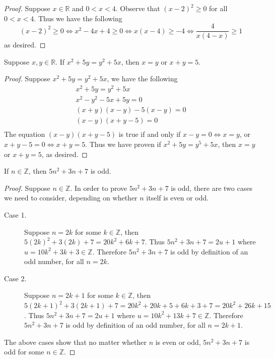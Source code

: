 \documentclass{exam}
\begin{document}
\begin{proof}
    Suppose $x\in\mathbb R$ and $0 < x < 4$. Observe that $(x-2)^2 \ge 0$ for all $0 < x < 4$. Thus we have the following \[
        (x-2)^2 \ge 0 \Leftrightarrow x^2-4x+4\ge0\Leftrightarrow x(x-4)\ge-4\Leftrightarrow \frac{4}{x(4-x)}\ge1
    \]
    as desired.
\end{proof}

\begin{proposition}{4.13}
    Suppose $x, y\in\mathbb R$. If $x^2+5y=y^2+5x$, then $x=y$ or $x + y = 5$.
\end{proposition}

\begin{proof}
    Suppose $x^2+5y=y^2+5x$, we have the following
    \begin{align*}
        x^2+5y=y^2+5x       \\
        x^2-y^2-5x+5y=0     \\
        (x+y)(x-y)-5(x-y)=0 \\
        (x-y)(x+y-5)=0      \\
    \end{align*}
    The equation $(x-y)(x+y-5)$ is true if and only if $x-y = 0 \iff x=y$, or $x+y-5 = 0 \iff x+y=5$. Thus we have proven if $x^2+5y=y^5+5x$, then $x=y$ or $x+y=5$, as desired.
\end{proof}

\begin{proposition}{4.14}
    If $n\in\mathbb Z$, then $5n^2+3n+7$ is odd.
\end{proposition}

\begin{proof}
    Suppose $n\in\mathbb Z$. In order to prove $5n^2 + 3n + 7$ is odd, there are two cases we need to consider, depending on whether $n$ itself is even or odd.
    \begin{description}
        \item[Case 1. ] Suppose $n = 2k$ for some $k \in \mathbb Z$, then $5(2k)^2+3(2k)+7 = 20k^2 + 6k + 7$. Thus $5n^2 + 3n + 7 = 2u + 1$ where $u = 10k^2 + 3k + 3 \in\mathbb Z$. Therefore $5n^2 + 3n +7$ is odd by definition of an odd number, for all $n = 2k$.
        \item[Case 2. ] Suppose $n = 2k + 1$ for some $k \in \mathbb Z$, then $5(2k+1)^2+3(2k+1)+7 = 20k^2+20k+5 + 6k + 3 + 7 = 20k^2 + 26k + 15$. Thus $5n^2 + 3n + 7 = 2u + 1$ where $u = 10k^2 + 13k + 7 \in\mathbb Z$. Therefore $5n^2 +3n +7$ is odd by definition of an odd number, for all $n = 2k + 1$.
    \end{description}

    The above cases show that no matter whether $n$ is even or odd, $5n^2 + 3n + 7$ is odd for some $n \in \mathbb Z$.
\end{proof}
\end{document}

